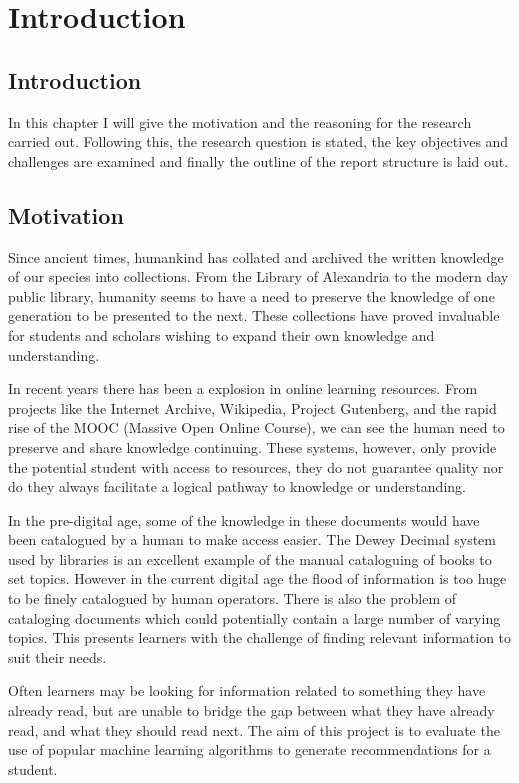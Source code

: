 \chapter{Introduction}

\section{Introduction}

In this chapter I will give the motivation and the reasoning for the research carried out.
Following this, the research question is stated, the key objectives and challenges are examined and finally the outline of the report structure is laid out.

\section{Motivation}

Since ancient times, humankind has collated and archived the written knowledge of our species into collections.
From the Library of Alexandria to the modern day public library, humanity seems to have a need to preserve the knowledge of one generation to be presented to the next.
These collections have proved invaluable for students and scholars wishing to expand their own knowledge and understanding.

In recent years there has been a explosion in online learning resources.
From projects like the Internet Archive, Wikipedia, Project Gutenberg, and the rapid rise of the MOOC (Massive Open Online Course), we can see the human need to preserve and share knowledge continuing.
These systems, however, only provide the potential student with access to resources, they do not guarantee quality nor do they always facilitate a logical pathway to knowledge or understanding.

In the pre-digital age, some of the knowledge in these documents would have been catalogued by a human to make access easier.
The Dewey Decimal system used by libraries is an excellent example of the manual cataloguing of books to set topics.
However in the current digital age the flood of information is too huge to be finely catalogued by human operators.
There is also the problem of cataloging documents which could potentially contain a large number of varying topics.
This presents learners with the challenge of finding relevant information to suit their needs.

Often learners may be looking for information related to something they have already read, but are unable to bridge the gap between what they have already read, and what they should read next.
The aim of this project is to evaluate the use of popular machine learning algorithms to generate recommendations for a student.

